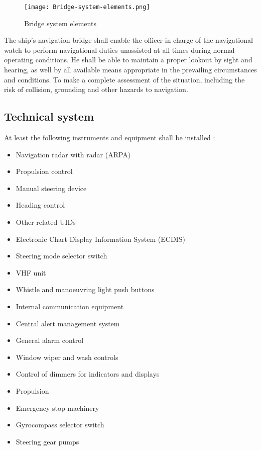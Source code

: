 \begin{figure}[H]
	\centering
	\texttt{[image: Bridge-system-elements.png]}
	\caption{Bridge system elements}
	\label{fig:Bridge-system-elements}
\end{figure}

The ship’s navigation bridge shall enable the officer in charge of the navigational watch to perform navigational duties unassisted at all times during normal operating conditions. He shall be able to maintain a proper lookout by sight and hearing, as well by all available means appropriate in the prevailing circumstances and conditions. To make a complete assessment of the situation, including the risk of collision, grounding and other hazards to navigation.

\subsection{Technical system}
At least the following instruments and equipment shall be installed \cite{DNVGL2011}: 
\begin{multicols}{2}
	\begin{itemize}
		\item Navigation radar with radar (\ac{ARPA})
		\item Propulsion control
		\item Manual steering device
		\item Heading control
		\item Other related \ac{UID}s
		\item Electronic Chart Display Information System (ECDIS)
		\item Steering mode selector switch
		\item VHF unit
		\item Whistle and manoeuvring light push buttons
		\item Internal communication equipment
		\item Central alert management system
		\item General alarm control
		\item Window wiper and wash controls
		\item Control of dimmers for indicators and displays
		\item Propulsion
		\item Emergency stop machinery
		\item Gyrocompass selector switch
		\item Steering gear pumps
	\end{itemize}
\end{multicols}

